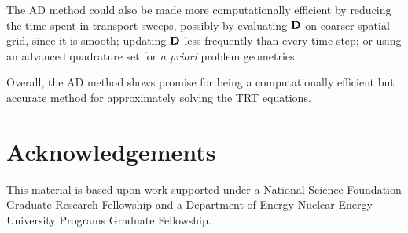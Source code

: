 \documentclass[11pt,letter,twoside]{mc2011}
\newcommand{\Dtens}{\mat{D}}
\begin{document}
The AD method could also be made
more computationally efficient by reducing the time spent in transport sweeps,
possibly by
evaluating $\Dtens$ on coarser spatial grid, since it is smooth;
updating $\Dtens$ less frequently than every time step; or
using an advanced quadrature set for \emph{a priori} problem geometries.

Overall, the AD method shows promise for being a computationally efficient
but accurate method for approximately solving the TRT equations.

\section*{Acknowledgements}
This material is based upon work supported under a National Science Foundation
Graduate Research Fellowship and a Department of Energy Nuclear
Energy University Programs Graduate Fellowship.




\end{document}
